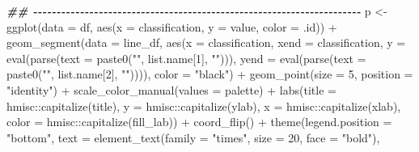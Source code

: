 \documentclass[
]{article}
\newenvironment{Shaded}{\begin{snugshade}}{\end{snugshade}}
\newcommand{\AttributeTok}[1]{\textcolor[rgb]{0.77,0.63,0.00}{#1}}
\newcommand{\DecValTok}[1]{\textcolor[rgb]{0.00,0.00,0.81}{#1}}
\newcommand{\DocumentationTok}[1]{\textcolor[rgb]{0.56,0.35,0.01}{\textbf{\textit{#1}}}}
\newcommand{\FunctionTok}[1]{\textcolor[rgb]{0.00,0.00,0.00}{#1}}
\newcommand{\NormalTok}[1]{#1}
\newcommand{\OtherTok}[1]{\textcolor[rgb]{0.56,0.35,0.01}{#1}}
\newcommand{\SpecialCharTok}[1]{\textcolor[rgb]{0.00,0.00,0.00}{#1}}
\newcommand{\StringTok}[1]{\textcolor[rgb]{0.31,0.60,0.02}{#1}}
\begin{document}
\begin{Shaded}
\begin{Highlighting}[]
    \DocumentationTok{\#\# {-}{-}{-}{-}{-}{-}{-}{-}{-}{-}{-}{-}{-}{-}{-}{-}{-}{-}{-}{-}{-}{-}{-}{-}{-}{-}{-}{-}{-}{-}{-}{-}{-}{-}{-}{-}{-}{-}{-}{-}{-}{-}{-}{-}{-}{-}{-}{-}{-}{-}{-}{-}{-}{-}{-}{-}{-}{-}{-}{-}{-}{-}{-}{-}{-}{-}{-}{-}{-}{-} }
\NormalTok{    p }\OtherTok{\textless{}{-}} \FunctionTok{ggplot}\NormalTok{(}\AttributeTok{data =}\NormalTok{ df,}
                \FunctionTok{aes}\NormalTok{(}\AttributeTok{x =}\NormalTok{ classification,}
                    \AttributeTok{y =}\NormalTok{ value,}
                    \AttributeTok{color =}\NormalTok{ .id)) }\SpecialCharTok{+}
      \FunctionTok{geom\_segment}\NormalTok{(}\AttributeTok{data =}\NormalTok{ line\_df,}
                   \FunctionTok{aes}\NormalTok{(}\AttributeTok{x =}\NormalTok{ classification,}
                       \AttributeTok{xend =}\NormalTok{ classification,}
                       \AttributeTok{y =} \FunctionTok{eval}\NormalTok{(}\FunctionTok{parse}\NormalTok{(}\AttributeTok{text =} \FunctionTok{paste0}\NormalTok{(}\StringTok{"\textasciigrave{}"}\NormalTok{, list.name[}\DecValTok{1}\NormalTok{], }\StringTok{"\textasciigrave{}"}\NormalTok{))),}
                       \AttributeTok{yend =} \FunctionTok{eval}\NormalTok{(}\FunctionTok{parse}\NormalTok{(}\AttributeTok{text =} \FunctionTok{paste0}\NormalTok{(}\StringTok{"\textasciigrave{}"}\NormalTok{, list.name[}\DecValTok{2}\NormalTok{], }\StringTok{"\textasciigrave{}"}\NormalTok{)))),}
                   \AttributeTok{color =} \StringTok{"black"}\NormalTok{) }\SpecialCharTok{+}
      \FunctionTok{geom\_point}\NormalTok{(}\AttributeTok{size =} \DecValTok{5}\NormalTok{,}
                 \AttributeTok{position =} \StringTok{"identity"}\NormalTok{) }\SpecialCharTok{+}
      \FunctionTok{scale\_color\_manual}\NormalTok{(}\AttributeTok{values =}\NormalTok{ palette) }\SpecialCharTok{+}
      \FunctionTok{labs}\NormalTok{(}\AttributeTok{title =}\NormalTok{ hmisc}\SpecialCharTok{::}\FunctionTok{capitalize}\NormalTok{(title),}
           \AttributeTok{y =}\NormalTok{ hmisc}\SpecialCharTok{::}\FunctionTok{capitalize}\NormalTok{(ylab),}
           \AttributeTok{x =}\NormalTok{ hmisc}\SpecialCharTok{::}\FunctionTok{capitalize}\NormalTok{(xlab),}
           \AttributeTok{color =}\NormalTok{ hmisc}\SpecialCharTok{::}\FunctionTok{capitalize}\NormalTok{(fill\_lab)) }\SpecialCharTok{+}
      \FunctionTok{coord\_flip}\NormalTok{() }\SpecialCharTok{+}
      \FunctionTok{theme}\NormalTok{(}\AttributeTok{legend.position =} \StringTok{"bottom"}\NormalTok{,}
            \AttributeTok{text =} \FunctionTok{element\_text}\NormalTok{(}\AttributeTok{family =} \StringTok{"times"}\NormalTok{, }\AttributeTok{size =} \DecValTok{20}\NormalTok{, }\AttributeTok{face =} \StringTok{"bold"}\NormalTok{),}

\end{Highlighting}
\end{Shaded}
\end{document}
